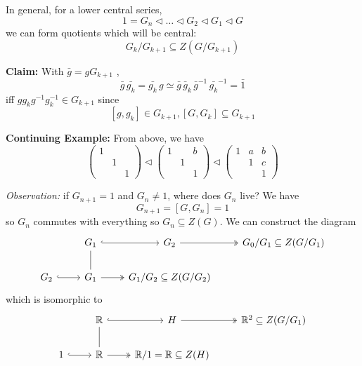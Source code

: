 \documentclass[12pt]{article}
\newcommand{\R}{\mathbb{R}}
\begin{document}
    In general, for a lower central series, 
    \[1 = G_n \triangleleft \dots \triangleleft G_2 \triangleleft G_1 \triangleleft G \]
    we can form quotients which will be central: 
    \[G_k/G_{k+1} \subseteq Z(G/G_{k+1})\]

    \textbf{Claim:} With $\bar g = gG_{k+1}$ , 
    \[\bar g\, \bar{g_k} = \bar{g_k}\,g \simeq \bar g\, \bar g_k\, {\bar g}^{-1}\, \bar{g_k}^{-1} = \bar 1\] 
    iff $gg_kg^{-1}g_k^{-1} \in G_{k+1}$ since 
    \[[g, g_k] \in G_{k+1}, [G, G_k] \subseteq G_{k+1} \]


    \textbf{Continuing Example:} From above, we have 
    \[\begin{pmatrix}
        1\\ 
        & 1\\
        & & 1
    \end{pmatrix} \triangleleft \begin{pmatrix}
        1 & & b\\ 
        & 1\\
        & & 1
    \end{pmatrix} \triangleleft \begin{pmatrix}
        1 & a& b\\ 
        & 1 & c\\
        & & 1
    \end{pmatrix}\]

    \emph{Observation:} if $G_{n+1} = 1$ and $G_n \neq 1$, where does $G_n$ live? We have 
    \[G_{n+1} = [G, G_n] = 1\]
    so $G_n$ commutes with everything so $G_n \subseteq Z(G)$. We can construct the diagram 
    \[\begin{tikzcd}
        & G_1 \arrow[hook]{r} & G_2 \arrow[two heads]{r} & G_0/G_1 \subseteq Z(G/G_1)\\ 
        G_2 \arrow[hook]{r} & G_1 \arrow[no head]{u} \arrow[two heads]{r} & G_1/G_2 \subseteq Z(G/G_2)
    \end{tikzcd}\] 
    which is isomorphic to 
    \[\begin{tikzcd}
        & \R \arrow[hook]{r} & H \arrow[two heads]{r} & \R^2 \subseteq Z(G/G_1)\\ 
        1 \arrow[hook]{r} & \R \arrow[no head]{u} \arrow[two heads]{r} &  \R/1 = \R \subseteq Z(H)
    \end{tikzcd}\]
\end{document}
